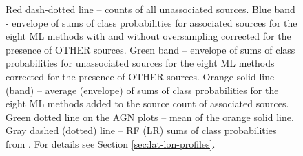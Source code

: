 \begin{figure}[h]
{Red dash-dotted line -- counts of all unassociated sources. 
Blue band - envelope of sums of class probabilities for associated sources for the eight ML methods with and without oversampling
corrected for the presence of OTHER sources.
Green band -- envelope of sums of class probabilities for unassociated sources for the eight ML methods corrected for the presence of OTHER sources. 
Orange solid line (band) -- average (envelope) of sums of class probabilities for the eight ML methods added to the source count of associated sources. 
Green dotted line on the AGN plots -- mean of the orange solid line.
Gray dashed (dotted) line -- RF (LR) sums of class probabilities from \cite{2016ApJ...820....8S}.
For details see Section \ref{sec:lat-lon-profiles}. }  
\label{fig:lat_profile}
\end{figure}

